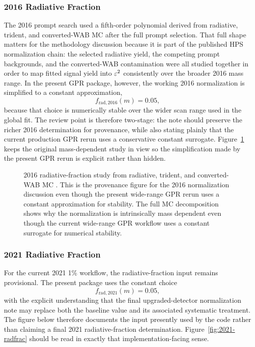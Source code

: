 \subsubsection{2016 Radiative Fraction}

The 2016 prompt search used a fifth-order polynomial derived from radiative, trident,
and converted-WAB MC after the full prompt selection. That full shape matters for the
methodology discussion because it is part of the published HPS normalization chain:
the selected radiative yield, the competing prompt backgrounds, and the converted-WAB
contamination were all studied together in order to map fitted signal yield into
$\varepsilon^2$ consistently over the broader 2016 mass range. In the present GPR package,
however, the working 2016 normalization is simplified to a constant approximation,
\begin{equation}
f_{\mathrm{rad},2016}(m) = 0.05,
\end{equation}
because that choice is numerically stable over the wider scan range used in the global
fit. The review point is therefore two-stage: the note should preserve the richer 2016
determination for provenance, while also stating plainly that the current production
GPR rerun uses a conservative constant surrogate. Figure~\ref{fig:2016-radfrac} keeps
the original mass-dependent study in view so the simplification made by the present GPR
rerun is explicit rather than hidden.

\begin{figure}[H]
\centering
{}
\caption{2016 radiative-fraction study from radiative, trident, and converted-WAB MC
\cite{HPS2016BumpInternal}. This is the provenance figure for the 2016 normalization
discussion even though the present wide-range GPR rerun uses a constant approximation
for stability. The full MC decomposition shows why the normalization is intrinsically
mass dependent even though the current wide-range GPR workflow uses a constant
surrogate for numerical stability.}
\label{fig:2016-radfrac}
\end{figure}

\subsubsection{2021 Radiative Fraction}

For the current 2021 1\% workflow, the radiative-fraction input remains provisional.
The present package uses the constant choice
\begin{equation}
f_{\mathrm{rad},2021}(m) = 0.05,
\end{equation}
with the explicit understanding that the final upgraded-detector normalization note may
replace both the baseline value and its associated systematic treatment. The figure
below therefore documents the input presently used by the code rather than claiming a
final 2021 radiative-fraction determination. Figure~\ref{fig:2021-radfrac} should be
read in exactly that implementation-facing sense.

